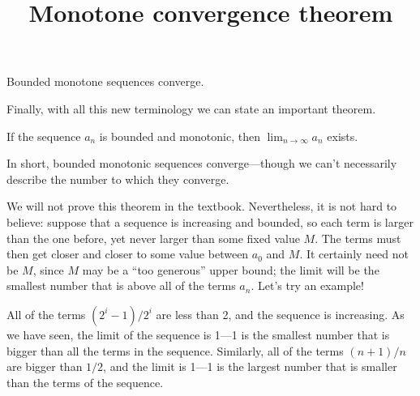 \documentclass{ximera}
\title{Monotone convergence theorem}
\newcommand{\ds}{\displaystyle}
\begin{document}
Bounded monotone sequences converge.
\begin{abstract}
  
\end{abstract}

\maketitle

Finally, with all this new terminology we can state an important
theorem.

\begin{theorem} If the sequence $a_n$ is bounded and monotonic, then
  $\lim_{n \to \infty} a_n$ exists.  \label{thm:bounded-monotonic}
\end{theorem}
In short, bounded monotonic sequences converge---though we can't
necessarily describe the number to which they converge.


We will not prove this theorem in the textbook. Nevertheless,
it is not hard to believe: suppose that a sequence is increasing and
bounded, so each term is larger than the one before, yet never larger
than some fixed value $M$. The terms must then get closer and closer
to some value between $\ds a_0$ and $M$. It certainly need not be $M$,
since $M$ may be a ``too generous'' upper bound; the limit will be the
smallest number that is above all of the terms
$\ds a_n$.  Let's try an example!

\begin{example}
  \label{example:sequence-bounded}
  All of the terms $\ds (2^i-1)/2^i$ are less than 2, and the sequence
  is increasing.  As we have seen, the limit of the sequence is 1---1
  is the smallest number that is bigger than all the terms in the
  sequence.  Similarly, all of the terms $(n+1)/n$ are bigger than
  $1/2$, and the limit is 1---1 is the largest number that is smaller
  than the terms of the sequence.
\end{example}
\end{document}
